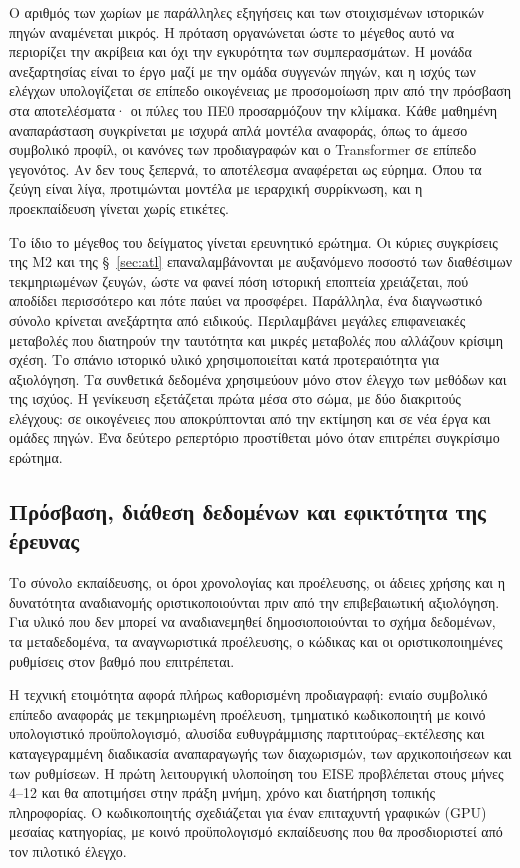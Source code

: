\documentclass[11pt,a4paper]{article}
\begin{document}
Ο αριθμός των χωρίων με παράλληλες εξηγήσεις και των στοιχισμένων ιστορικών πηγών αναμένεται μικρός. Η πρόταση οργανώνεται ώστε το μέγεθος αυτό να περιορίζει την ακρίβεια και όχι την εγκυρότητα των συμπερασμάτων. Η μονάδα ανεξαρτησίας είναι το έργο μαζί με την ομάδα συγγενών πηγών, και η ισχύς των ελέγχων υπολογίζεται σε επίπεδο οικογένειας με προσομοίωση πριν από την πρόσβαση στα αποτελέσματα· οι πύλες του ΠΕ0 προσαρμόζουν την κλίμακα. Κάθε μαθημένη αναπαράσταση συγκρίνεται με ισχυρά απλά μοντέλα αναφοράς, όπως το άμεσο συμβολικό προφίλ, οι κανόνες των προδιαγραφών και ο Transformer σε επίπεδο γεγονότος. Αν δεν τους ξεπερνά, το αποτέλεσμα αναφέρεται ως εύρημα. Όπου τα ζεύγη είναι λίγα, προτιμώνται μοντέλα με ιεραρχική συρρίκνωση, και η προεκπαίδευση γίνεται χωρίς ετικέτες.

Το ίδιο το μέγεθος του δείγματος γίνεται ερευνητικό ερώτημα. Οι κύριες συγκρίσεις της M2 και της §~\ref{sec:atl} επαναλαμβάνονται με αυξανόμενο ποσοστό των διαθέσιμων τεκμηριωμένων ζευγών, ώστε να φανεί πόση ιστορική εποπτεία χρειάζεται, πού αποδίδει περισσότερο και πότε παύει να προσφέρει. Παράλληλα, ένα διαγνωστικό σύνολο κρίνεται ανεξάρτητα από ειδικούς. Περιλαμβάνει μεγάλες επιφανειακές μεταβολές που διατηρούν την ταυτότητα και μικρές μεταβολές που αλλάζουν κρίσιμη σχέση. Το σπάνιο ιστορικό υλικό χρησιμοποιείται κατά προτεραιότητα για αξιολόγηση. Τα συνθετικά δεδομένα χρησιμεύουν μόνο στον έλεγχο των μεθόδων και της ισχύος. Η γενίκευση εξετάζεται πρώτα μέσα στο σώμα, με δύο διακριτούς ελέγχους: σε οικογένειες που αποκρύπτονται από την εκτίμηση και σε νέα έργα και ομάδες πηγών. Ένα δεύτερο ρεπερτόριο προστίθεται μόνο όταν επιτρέπει συγκρίσιμο ερώτημα.

\subsection{Πρόσβαση, διάθεση δεδομένων και εφικτότητα της έρευνας}\label{sec:data-rights}

Το σύνολο εκπαίδευσης, οι όροι χρονολογίας και προέλευσης, οι άδειες χρήσης και η δυνατότητα αναδιανομής οριστικοποιούνται πριν από την επιβεβαιωτική αξιολόγηση. Για υλικό που δεν μπορεί να αναδιανεμηθεί δημοσιοποιούνται το σχήμα δεδομένων, τα μεταδεδομένα, τα αναγνωριστικά προέλευσης, ο κώδικας και οι οριστικοποιημένες ρυθμίσεις στον βαθμό που επιτρέπεται.

Η τεχνική ετοιμότητα αφορά πλήρως καθορισμένη προδιαγραφή: ενιαίο συμβολικό επίπεδο αναφοράς με τεκμηριωμένη προέλευση, τμηματικό κωδικοποιητή με κοινό υπολογιστικό προϋπολογισμό, αλυσίδα ευθυγράμμισης παρτιτούρας--εκτέλεσης και καταγεγραμμένη διαδικασία αναπαραγωγής των διαχωρισμών, των αρχικοποιήσεων και των ρυθμίσεων. Η πρώτη λειτουργική υλοποίηση του EISE προβλέπεται στους μήνες 4--12 και θα αποτιμήσει στην πράξη μνήμη, χρόνο και διατήρηση τοπικής πληροφορίας. Ο κωδικοποιητής σχεδιάζεται για έναν επιταχυντή γραφικών (GPU) μεσαίας κατηγορίας, με κοινό προϋπολογισμό εκπαίδευσης που θα προσδιοριστεί από τον πιλοτικό έλεγχο.
\end{document}
